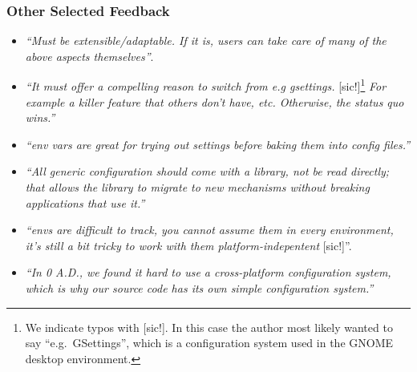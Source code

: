 \subsubsection{Other Selected Feedback}

\begin{itemize}
\item \emph{``Must be extensible/adaptable. If it is, users can take care of many of the above aspects themselves''}.
\item \emph{``It must offer a compelling reason to switch from e.g gsettings.} [sic!]\footnote{We indicate typos with [sic!]. In this case the author most likely wanted to say ``e.g.\ GSettings'', which is a configuration system used in the GNOME desktop environment.} \emph{For example a killer feature that others don't have, etc. Otherwise, the status quo wins.''}
\item \emph{``env vars are great for trying out settings before baking them into config files.''}
\item \emph{``All generic configuration should come with a library, not be read directly; that allows the library to migrate to new mechanisms without breaking applications that use it.''}
\item \emph{``envs are difficult to track, you cannot assume them in every environment, it's still a bit tricky to work with them platform-indepentent} [sic!]''.
\item \emph{``In 0 A.D., we found it hard to use a cross-platform configuration system, which is why our source code has its own simple configuration system.''}
\end{itemize}

